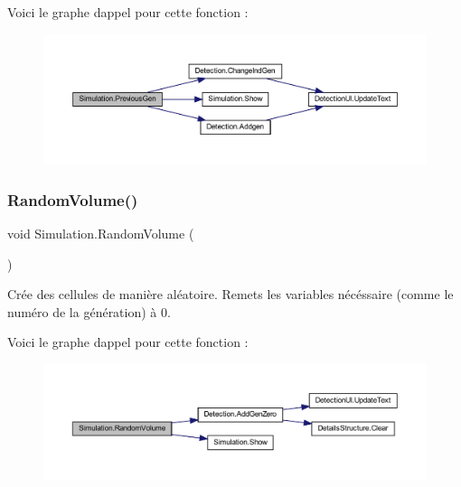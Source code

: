Voici le graphe d\textquotesingle{}appel pour cette fonction \+:
\nopagebreak
\begin{figure}[H]
\begin{center}
\leavevmode
\includegraphics[width=350pt]{class_simulation_a2af29808f03940f4a8824c926f8c8cf9_cgraph}
\end{center}
\end{figure}
\mbox{\label{class_simulation_aff8ad1d9fe429a08bf0d42f52b08b71b}} 
\subsubsection{\texorpdfstring{Random\+Volume()}{RandomVolume()}}
{\footnotesize\ttfamily void Simulation.\+Random\+Volume (\begin{DoxyParamCaption}{ }\end{DoxyParamCaption})\hspace{0.3cm}{\ttfamily [inline]}}



Crée des cellules de manière aléatoire. Remets les variables nécéssaire (comme le numéro de la génération) à 0. 

Voici le graphe d\textquotesingle{}appel pour cette fonction \+:
\nopagebreak
\begin{figure}[H]
\begin{center}
\leavevmode
\includegraphics[width=350pt]{class_simulation_aff8ad1d9fe429a08bf0d42f52b08b71b_cgraph}
\end{center}
\end{figure}
\mbox{\label{class_simulation_a500982098740ae238f349a6fed0affd8}} 
